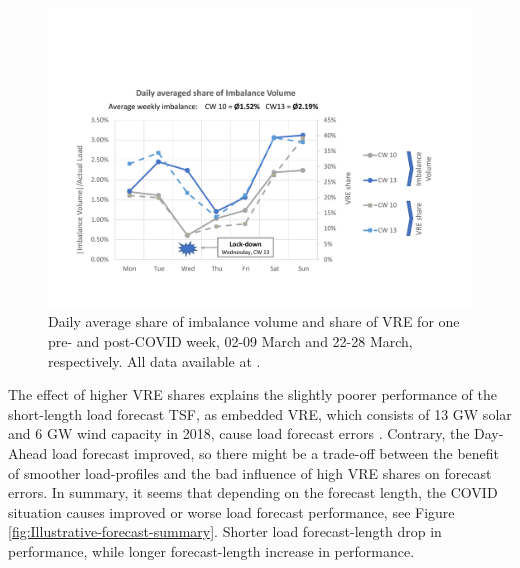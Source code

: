 \documentclass[energies,article,submit,moreauthors,pdftex]{Definitions/mdpi}
\begin{document}
\begin{figure}[H]
\centering
\hspace{-25pt}\includegraphics[trim={0cm 2cm 2.5cm 4cm},clip,width=1\textwidth]{Graphics/Illustration-Imbalance-2weeks.pdf}
\caption{Daily average share of imbalance volume and share of VRE for one pre- and post-COVID week, 02-09 March and 22-28 March, respectively. All data available at \protect\cite{ELEXON2020ELEXONBMRS}.}\label{fig:ImbalanceVolume-daily}
\end{figure} 

The effect of higher VRE shares explains the slightly poorer performance of the short-length load forecast TSF, as embedded VRE, which consists of 13 GW solar and 6 GW wind capacity in 2018,  cause load forecast errors \cite{NationalgridESO2018QuarterlyMarch18, NationalGridESO2019EnergyRoadmap}. Contrary, the Day-Ahead load forecast improved, so there might be a trade-off between the benefit of smoother load-profiles and the bad influence of high VRE shares on forecast errors. In summary, it seems that depending on the forecast length, the COVID situation causes improved or worse load forecast performance, see Figure \ref{fig:Illustrative-forecast-summary}. Shorter load forecast-length drop in performance, while longer forecast-length increase in performance.
\end{document}
